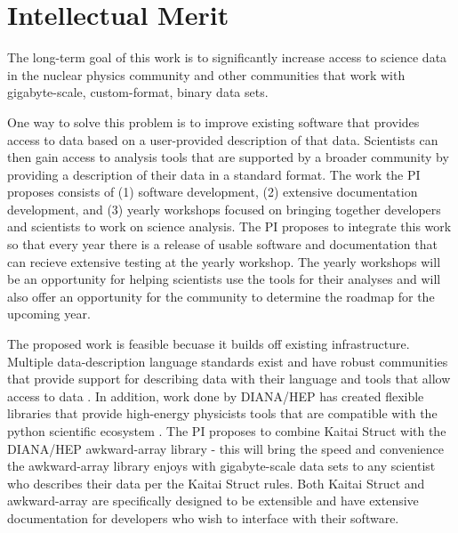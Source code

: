 \section{Intellectual Merit}

The long-term goal of this work is to significantly increase access to science data in the nuclear physics community and other communities that work with gigabyte-scale, custom-format, binary data sets.  

One way to solve this problem is to improve existing software that provides access to data based on a user-provided description of that data.  Scientists can then gain access to analysis tools that are supported by a broader community by providing a description of their data in a standard format.  The work the PI proposes consists of (1) software development, (2) extensive documentation development, and (3) yearly workshops focused on bringing together developers and scientists to work on science analysis.  The PI proposes to integrate this work so that every year there is a release of usable software and documentation that can recieve extensive testing at the yearly workshop.  The yearly workshops will be an opportunity for helping scientists use the tools for their analyses and will also offer an opportunity for the community to determine the roadmap for the upcoming year.

The proposed work is feasible becuase it builds off existing infrastructure.  Multiple data-description language standards exist and have robust communities that provide support for describing data with their language and tools that allow access to data \cite{kaitai, kaitai-spec, dfdl, dfdl-spec}.  In addition, work done by DIANA/HEP has created flexible libraries that provide high-energy physicists tools that are compatible with the python scientific ecosystem \cite{diana-hep, iris-hep}.  The PI proposes to combine Kaitai Struct with the DIANA/HEP awkward-array library - this will bring the speed and convenience the awkward-array library enjoys with gigabyte-scale data sets to any scientist who describes their data per the Kaitai Struct rules.  Both Kaitai Struct and awkward-array are specifically designed to be extensible and have extensive documentation for developers who wish to interface with their software.  

